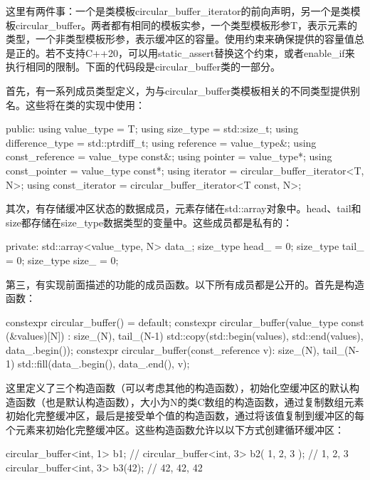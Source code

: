 这里有两件事：一个是类模板circular\_buffer\_iterator的前向声明，另一个是类模板circular\_buffer。两者都有相同的模板实参，一个类型模板形参T，表示元素的类型，一个非类型模板形参，表示缓冲区的容量。使用约束来确保提供的容量值总是正的。若不支持C++20，可以用static\_assert替换这个约束，或者enable\_if来执行相同的限制。下面的代码段是circular\_buffer类的一部分。

首先，有一系列成员类型定义，为与circular\_buffer类模板相关的不同类型提供别名。这些将在类的实现中使用：

\begin{cpp}
	public:
	using value_type = T;
	using size_type = std::size_t;
	using difference_type = std::ptrdiff_t;
	using reference = value_type&;
	using const_reference = value_type const&;
	using pointer = value_type*;
	using const_pointer = value_type const*;
	using iterator = circular_buffer_iterator<T, N>;
	using const_iterator =
	circular_buffer_iterator<T const, N>;
\end{cpp}

其次，有存储缓冲区状态的数据成员，元素存储在std::array对象中。head、tail和size都存储在size\_type数据类型的变量中。这些成员都是私有的：

\begin{cpp}
private:
	std::array<value_type, N> data_;
	size_type head_ = 0;
	size_type tail_ = 0;
	size_type size_ = 0;
\end{cpp}

第三，有实现前面描述的功能的成员函数。以下所有成员都是公开的。首先是构造函数：

\begin{cpp}
constexpr circular_buffer() = default;
constexpr circular_buffer(value_type const (&values)[N]) :
	size_(N), tail_(N-1)
{
	std::copy(std::begin(values), std::end(values),
	data_.begin());
}
constexpr circular_buffer(const_reference v):
	size_(N), tail_(N-1)
{
	std::fill(data_.begin(), data_.end(), v);
}
\end{cpp}

这里定义了三个构造函数（可以考虑其他的构造函数），初始化空缓冲区的默认构造函数（也是默认构造函数），大小为N的类C数组的构造函数，通过复制数组元素初始化完整缓冲区，最后是接受单个值的构造函数，通过将该值复制到缓冲区的每个元素来初始化完整缓冲区。这些构造函数允许以以下方式创建循环缓冲区：

\begin{cpp}
circular_buffer<int, 1> b1; // {}
circular_buffer<int, 3> b2({ 1, 2, 3 }); // {1, 2, 3}
circular_buffer<int, 3> b3(42); // {42, 42, 42}
\end{cpp}

